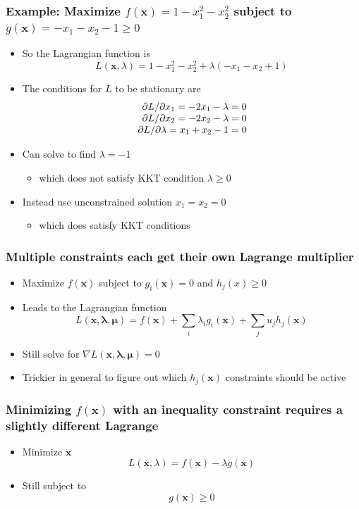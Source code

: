 \documentclass[12pt,notes,mathserif]{beamer}
\begin{document}
\begin{frame}[c]
\frametitle{Example: Maximize $f(\mathbf{x})=1-x_1^2-x_2^2$ subject to $g(\mathbf{x})=-x_1-x_2-1\geqslant{}0$}
\begin{itemize}
\item So the Lagrangian function is 
\[
L(\mathbf{x},\lambda)=1-x_1^2-x_2^2+\lambda(-x_1-x_2+1)
\]
\item The conditions for $L$ to be stationary are 
\[
\begin{array}{r@{~}l}
\partial L/\partial x_1=-2x_1-\lambda=0\\
\partial L/\partial x_2=-2x_2-\lambda=0\\
\partial L/\partial \lambda=x_1+x_2-1=0\\
\end{array}
\]
\item Can solve to find $\lambda=-1$
\begin{itemize}
\item which does not satisfy KKT condition $\lambda \geqslant{}0$
\end{itemize}
\item Instead use unconstrained solution $x_1=x_2=0$
\begin{itemize}
\item which does satisfy KKT conditions
\end{itemize}
\end{itemize}
\end{frame}


\begin{frame}[c]
\frametitle{Multiple constraints each get their own Lagrange multiplier}
\begin{itemize}
\item Maximize $f(\mathbf{x})$ subject to $g_i(\mathbf{x})= 0$ and $h_j(x)\geqslant{}0$
\item Leads to the Lagrangian function
\[
L(\mathbf{x,\lambda,\mu})=f(\mathbf{x})+\sum_i \lambda_ig_i(\mathbf{x})+\sum_ju_jh_j(\mathbf{x})
\]
\item Still solve for $\nabla L(\mathbf{x,\lambda,\mu})= 0$
\item Trickier in general to figure out which $h_j(\mathbf{x})$ constraints should be active
\end{itemize}
\end{frame}



\begin{frame}[c]
\frametitle{Minimizing $f(\mathbf{x})$ with an inequality constraint requires a slightly different Lagrange} 
\begin{itemize}
\item Minimize \wrt $\mathbf{x}$
\[
L(\mathbf{x},\lambda)=f(\mathbf{x})-\lambda g(\mathbf{x})
\]
\item Still subject to
\[
g(\mathbf{x})\geqslant{}0
\]
\end{itemize}
\end{frame}
\end{document}
